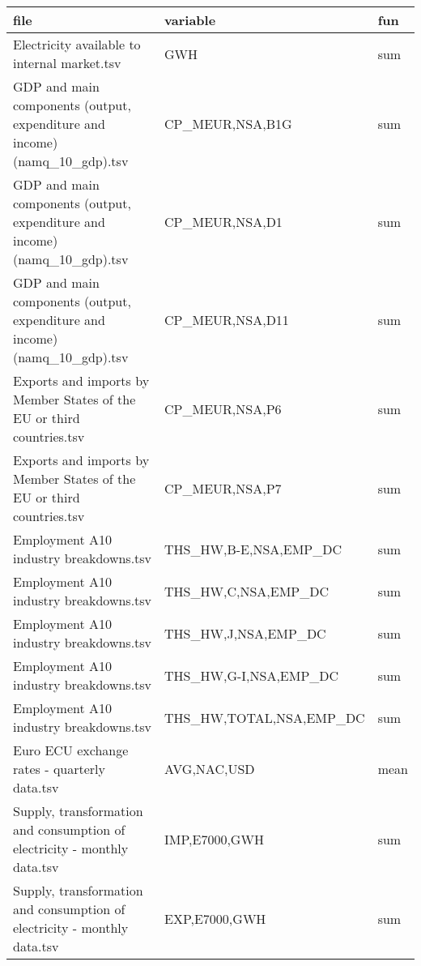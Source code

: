 \footnotesize{\begin{tabular}{ |p{7.5cm}| p{5.5cm} | p{2cm} |}
  \hline
  file&variable&fun\\
   \hline
Electricity available to internal market.tsv&GWH&sum\\
   \hline
GDP and main components (output, expenditure and income) (namq\_10\_gdp).tsv&CP\_MEUR,NSA,B1G&sum\\
   \hline
GDP and main components (output, expenditure and income) (namq\_10\_gdp).tsv&CP\_MEUR,NSA,D1&sum\\
   \hline
GDP and main components (output, expenditure and income) (namq\_10\_gdp).tsv&CP\_MEUR,NSA,D11&sum\\
   \hline
Exports and imports by Member States of the EU or third countries.tsv&CP\_MEUR,NSA,P6&sum\\
   \hline
Exports and imports by Member States of the EU or third countries.tsv&CP\_MEUR,NSA,P7&sum\\
   \hline
Employment A10 industry breakdowns.tsv&THS\_HW,B-E,NSA,EMP\_DC&sum\\
   \hline
Employment A10 industry breakdowns.tsv&THS\_HW,C,NSA,EMP\_DC&sum\\
   \hline
Employment A10 industry breakdowns.tsv&THS\_HW,J,NSA,EMP\_DC&sum\\
   \hline
Employment A10 industry breakdowns.tsv&THS\_HW,G-I,NSA,EMP\_DC&sum\\
   \hline
Employment A10 industry breakdowns.tsv&THS\_HW,TOTAL,NSA,EMP\_DC&sum\\
   \hline
Euro ECU exchange rates - quarterly data.tsv&AVG,NAC,USD&mean\\
   \hline
Supply, transformation and consumption of electricity - monthly data.tsv&IMP,E7000,GWH&sum\\
   \hline
Supply, transformation and consumption of electricity - monthly data.tsv&EXP,E7000,GWH&sum\\
\hline
\end{tabular}}

